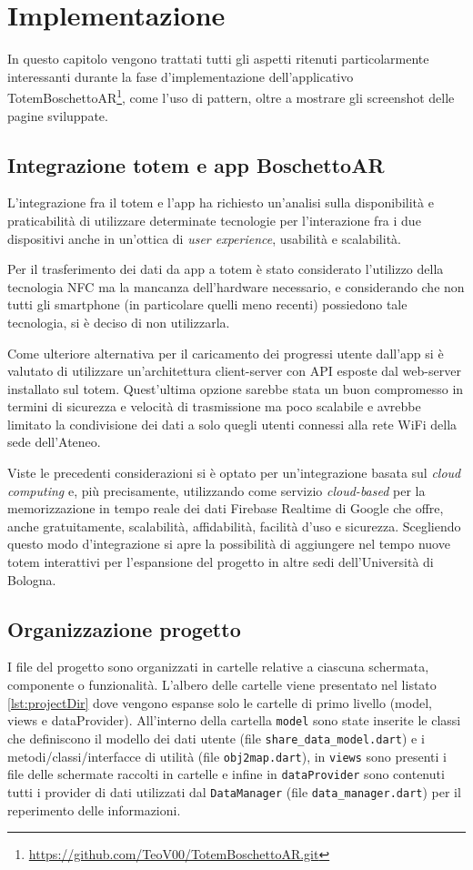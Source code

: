 \chapter{Implementazione}
In questo capitolo vengono trattati tutti gli aspetti ritenuti particolarmente interessanti durante la fase d'implementazione dell'applicativo TotemBoschettoAR\footnote{\url{https://github.com/TeoV00/TotemBoschettoAR.git}}, come l'uso di pattern, oltre a mostrare gli screenshot delle pagine sviluppate.

\section{Integrazione totem e app BoschettoAR}
L'integrazione fra il totem e l'app ha richiesto un'analisi sulla disponibilità e praticabilità di utilizzare determinate tecnologie per l'interazione fra i due dispositivi anche in un'ottica di \textit{user experience}, usabilità e scalabilità.

Per il trasferimento dei dati da app a totem è stato considerato l'utilizzo della tecnologia NFC ma la mancanza dell'hardware necessario, e considerando che non tutti gli smartphone (in particolare quelli meno recenti) possiedono tale tecnologia, si è deciso di non utilizzarla.

Come ulteriore alternativa per il caricamento dei progressi utente dall'app si è valutato di utilizzare un'architettura client-server con API esposte dal web-server installato sul totem. Quest'ultima opzione sarebbe stata un buon compromesso in termini di sicurezza e velocità di trasmissione ma poco scalabile e avrebbe limitato la condivisione dei dati a solo quegli utenti connessi alla rete WiFi della sede dell'Ateneo.

Viste le precedenti considerazioni si è optato per un'integrazione basata sul \textit{cloud computing} e, più precisamente, utilizzando come servizio \textit{cloud-based} per la memorizzazione in tempo reale dei dati Firebase Realtime di Google \cite{firebase} che offre, anche gratuitamente, scalabilità, affidabilità, facilità d'uso e sicurezza.
Scegliendo questo modo d'integrazione si apre la possibilità di aggiungere nel tempo nuove totem interattivi per l'espansione del progetto in altre sedi dell'Università di Bologna.

\section{Organizzazione progetto}
I file del progetto sono organizzati in cartelle relative a ciascuna schermata, componente o funzionalità. L'albero delle cartelle viene presentato nel listato \ref{lst:projectDir} dove vengono espanse solo le cartelle di primo livello (model, views e dataProvider). All'interno della cartella \texttt{model} sono state inserite le classi che definiscono il modello dei dati utente (file \texttt{share\_data\_model.dart}) e i metodi/classi/interfacce di utilità (file \texttt{obj2map.dart}), in \texttt{views} sono presenti i file delle schermate raccolti in cartelle e infine in \texttt{dataProvider} sono contenuti tutti i provider di dati utilizzati dal \texttt{DataManager} (file \texttt{data\_manager.dart}) per il reperimento delle informazioni.

